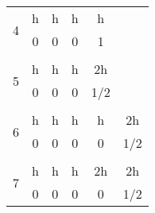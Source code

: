 \documentclass[review,12pt]{elsarticle}
\begin{document}
\begin{table}[htbp!]
\begin{tabular}{cccccc}
\multicolumn{1}{|c|}{\multirow{2}{*}{4}} & \multicolumn{1}{c|}{h} & \multicolumn{1}{c|}{h} & \multicolumn{1}{c|}{h} & \multicolumn{1}{c|}{h}   &                          \\ \cline{2-5}
\multicolumn{1}{|c|}{}                   & \multicolumn{1}{c|}{0} & \multicolumn{1}{c|}{0} & \multicolumn{1}{c|}{0} & \multicolumn{1}{c|}{1}   &                          \\ \cline{1-5}
                                         &                        &                        &                        &                          &                          \\ \cline{1-5}
\multicolumn{1}{|c|}{\multirow{2}{*}{5}} & \multicolumn{1}{c|}{h} & \multicolumn{1}{c|}{h} & \multicolumn{1}{c|}{h} & \multicolumn{1}{c|}{2h}  &                          \\ \cline{2-5}
\multicolumn{1}{|c|}{}                   & \multicolumn{1}{c|}{0} & \multicolumn{1}{c|}{0} & \multicolumn{1}{c|}{0} & \multicolumn{1}{c|}{1/2} &                          \\ \cline{1-5}
                                         &                        &                        &                        &                          &                          \\ \hline
\multicolumn{1}{|c|}{\multirow{2}{*}{6}} & \multicolumn{1}{c|}{h} & \multicolumn{1}{c|}{h} & \multicolumn{1}{c|}{h} & \multicolumn{1}{c|}{h}   & \multicolumn{1}{c|}{2h}  \\ \cline{2-6} 
\multicolumn{1}{|c|}{}                   & \multicolumn{1}{c|}{0} & \multicolumn{1}{c|}{0} & \multicolumn{1}{c|}{0} & \multicolumn{1}{c|}{0}   & \multicolumn{1}{c|}{1/2} \\ \hline
                                         &                        &                        &                        &                          &                          \\ \hline
\multicolumn{1}{|c|}{\multirow{2}{*}{7}} & \multicolumn{1}{c|}{h} & \multicolumn{1}{c|}{h} & \multicolumn{1}{c|}{h} & \multicolumn{1}{c|}{2h}  & \multicolumn{1}{c|}{2h}  \\ \cline{2-6} 
\multicolumn{1}{|c|}{}                   & \multicolumn{1}{c|}{0} & \multicolumn{1}{c|}{0} & \multicolumn{1}{c|}{0} & \multicolumn{1}{c|}{0}   & \multicolumn{1}{c|}{1/2} \\ \hline
\end{tabular}
\end{table}
\end{document}
